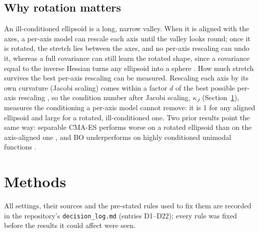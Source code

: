 \documentclass[12pt]{article}
\begin{document}
\subsection{Why rotation matters}
An ill-conditioned ellipsoid is a long, narrow valley. When it is aligned with the axes, a per-axis model can rescale each axis until the valley looks round; once it is rotated, the stretch lies between the axes, and no per-axis rescaling can undo it, whereas a full covariance can still learn the rotated shape, since a covariance equal to the inverse Hessian turns any ellipsoid into a sphere \parencite[p.~7]{hansen2023tutorial}. How much stretch survives the best per-axis rescaling can be measured. Rescaling each axis by its own curvature (Jacobi scaling) comes within a factor $d$ of the best possible per-axis rescaling \parencite[van der Sluis's theorem, as stated in][]{bradley2012equilibration}, so the condition number after Jacobi scaling, $\kappa_J$ (Section~\ref{sec:methods}), measures the conditioning a per-axis model cannot remove: it is 1 for any aligned ellipsoid and large for a rotated, ill-conditioned one. Two prior results point the same way: separable CMA-ES performs worse on a rotated ellipsoid than on the axis-aligned one \parencite{loshchilov2014lmcma}, and BO underperforms on highly conditioned unimodal functions \parencite{leriche2021revisiting}.

\section{Methods}
\label{sec:methods}

All settings, their sources and the pre-stated rules used to fix them are recorded in the repository's \texttt{decision\_log.md} (entries D1--D22); every rule was fixed before the results it could affect were seen.
\end{document}
